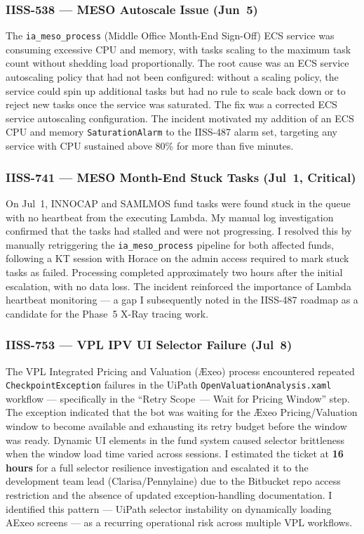 \subsubsection{IISS-538 --- MESO Autoscale Issue (Jun~5)}

The \texttt{ia\_meso\_process} (Middle Office Month-End Sign-Off) ECS service
was consuming excessive CPU and memory, with tasks scaling to the maximum
task count without shedding load proportionally. The root cause was an
ECS service autoscaling policy that had not been configured: without a scaling
policy, the service could spin up additional tasks but had no rule to scale
back down or to reject new tasks once the service was saturated. The fix was
a corrected ECS service autoscaling configuration. The incident motivated my
addition of an ECS CPU and memory \texttt{SaturationAlarm} to the IISS-487
alarm set, targeting any service with CPU sustained above 80\% for more than
five minutes.

\subsubsection{IISS-741 --- MESO Month-End Stuck Tasks (Jul~1, Critical)}

On Jul~1, INNOCAP and SAMLMOS fund tasks were found stuck in the queue with
no heartbeat from the executing Lambda. My manual log investigation confirmed that
the tasks had stalled and were not progressing. I resolved this by manually
retriggering the \texttt{ia\_meso\_process} pipeline for both affected funds,
following a KT session with Horace on the admin access required to mark stuck
tasks as failed. Processing completed approximately two hours after the initial
escalation, with no data loss. The incident reinforced the importance of
Lambda heartbeat monitoring --- a gap I subsequently noted in the IISS-487
roadmap as a candidate for the Phase~5 X-Ray tracing work.

\subsubsection{IISS-753 --- VPL IPV UI Selector Failure (Jul~8)}

The VPL Integrated Pricing and Valuation (\AE xeo) process encountered
repeated \texttt{CheckpointException} failures in the UiPath
\texttt{OpenValuationAnalysis.xaml} workflow --- specifically in the
``Retry Scope~--- Wait for Pricing Window'' step. The exception indicated that
the bot was waiting for the \AE xeo Pricing/Valuation window to become available
and exhausting its retry budget before the window was ready. Dynamic UI elements
in the fund system caused selector brittleness when the window load time varied
across sessions. I estimated the ticket at \textbf{16 hours} for a full
selector resilience investigation and escalated it to the development team
lead (Clarisa/Pennylaine) due to the Bitbucket repo access restriction and
the absence of updated exception-handling documentation. I identified this pattern --- UiPath
selector instability on dynamically loading AExeo screens --- as a recurring operational risk across multiple VPL workflows.


